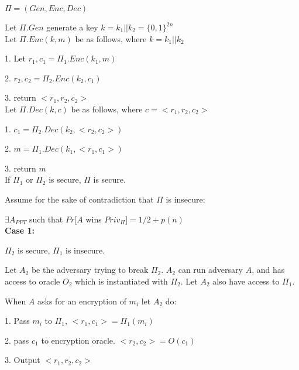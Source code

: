 \documentclass[12pt]{article}
\newenvironment{question}[2][Question]{\begin{trivlist}
		\item[\hskip \labelsep {\bfseries #1}\hskip \labelsep {\bfseries #2.}]}{\end{trivlist}}
\begin{document}
	\begin{question}{4}	
		$\Pi=(Gen, Enc, Dec)$
		
		Let $\Pi.Gen$ generate a key $k=k_1||k_2=\{0,1\}^{2n}$\\
		
		Let $\Pi.Enc(k, m)$ be as follows, where $k=k_1||k_2$
		
		\hspace{\parindent} 1. Let $r_1, c_1 = \Pi_1.Enc(k_1, m)$
		
		\hspace{\parindent} 2. $r_2, c_2 = \Pi_2.Enc(k_2, c_1)$
		
		\hspace{\parindent} 3. return $<r_1, r_2, c_2>$\\
		
		
		Let $\Pi.Dec(k, c)$ be as follows, where $c=<r_1, r_2, c_2>$
		
		\hspace{\parindent} 1. $c_1 = \Pi_2.Dec(k_2, <r_2, c_2>)$
		
		\hspace{\parindent} 2. $m = \Pi_1.Dec(k_1, <r_1, c_1>)$
		
		\hspace{\parindent} 3. return $m$\\
		
		
		If $\Pi_1$ or $\Pi_2$ is secure, $\Pi$ is secure. 
		
		Assume for the sake of contradiction that $\Pi$ is insecure: 
		
		$\exists A_{PPT}$ such that $Pr[A$ wins $Priv_\Pi]=1/2 + p(n)$\\
		
		
		\textbf{Case 1:}
		
		$\Pi_2$ is secure, $\Pi_1$ is insecure. 
		
		Let $A_2$ be the adversary trying to break $\Pi_2$. $A_2$ can run adversary $A$, and has access to oracle $O_2$ which is instantiated with $\Pi_2$. Let $A_2$ also have access to $\Pi_1$.
		
		
		When $A$ asks for an encryption of $m_i$ let $A_2$ do:
		
		\hspace{\parindent} 1. Pass $m_i$ to $\Pi_1$, $<r_1, c_1> = \Pi_1(m_i)$
		
		\hspace{\parindent} 2. pass $c_1$ to encryption oracle. $<r_2, c_2> = O(c_1)$
		
		
		\hspace{\parindent} 3. Output $<r_1, r_2, c_2>$
		

\end{question}
\end{document}
